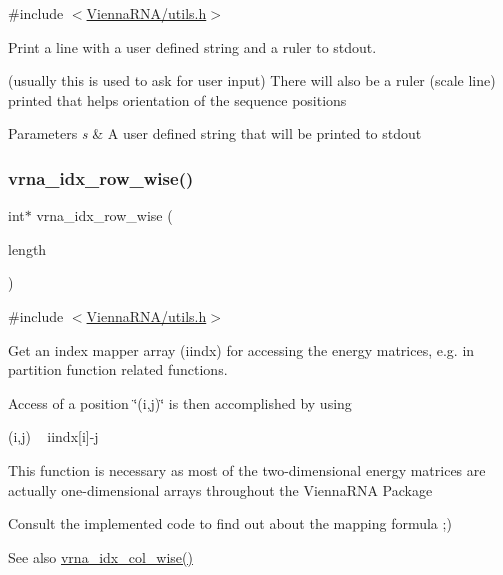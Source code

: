{\ttfamily \#include $<$\mbox{\hyperlink{utils_8h}{Vienna\+R\+N\+A/utils.\+h}}$>$}



Print a line with a user defined string and a ruler to stdout. 

(usually this is used to ask for user input) There will also be a ruler (scale line) printed that helps orientation of the sequence positions


\begin{DoxyParams}{Parameters}
{\em s} & A user defined string that will be printed to stdout \\
\hline
\end{DoxyParams}
\mbox{\label{group__utils_ga70b180e9ea764218a82647a1cd347445}} 
\subsubsection{\texorpdfstring{vrna\+\_\+idx\+\_\+row\+\_\+wise()}{vrna\_idx\_row\_wise()}}
{\footnotesize\ttfamily int$\ast$ vrna\+\_\+idx\+\_\+row\+\_\+wise (\begin{DoxyParamCaption}\item[{unsigned int}]{length }\end{DoxyParamCaption})}



{\ttfamily \#include $<$\mbox{\hyperlink{utils_8h}{Vienna\+R\+N\+A/utils.\+h}}$>$}



Get an index mapper array (iindx) for accessing the energy matrices, e.\+g. in partition function related functions. 

Access of a position \char`\"{}(i,j)\char`\"{} is then accomplished by using\begin{DoxyVerb}(i,j) ~ iindx[i]-j \end{DoxyVerb}
 This function is necessary as most of the two-\/dimensional energy matrices are actually one-\/dimensional arrays throughout the Vienna\+R\+NA Package

Consult the implemented code to find out about the mapping formula ;)

\begin{DoxySeeAlso}{See also}
\mbox{\hyperlink{group__utils_ga89ebc69c52fa0c78c9e1974b0017746b}{vrna\+\_\+idx\+\_\+col\+\_\+wise()}} 
\end{DoxySeeAlso}

